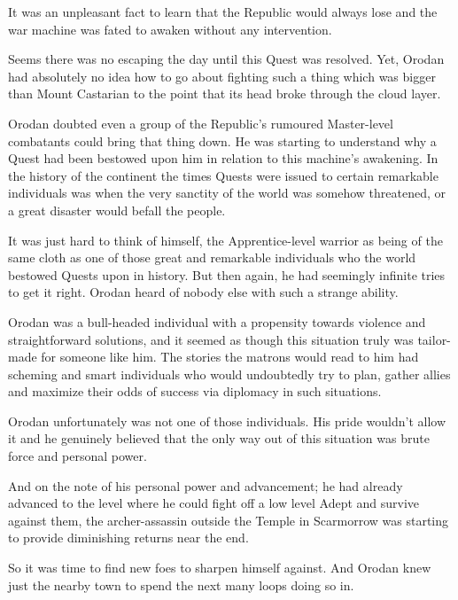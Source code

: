 \documentclass[a4paper,10pt]{book}
\begin{document}
It was an unpleasant fact to learn that the Republic would always lose and the war machine was fated to awaken without any intervention.\par
Seems there was no escaping the day until this Quest was resolved. Yet, Orodan had absolutely no idea how to go about fighting such a thing which was bigger than Mount Castarian to the point that its head broke through the cloud layer.\par
Orodan doubted even a group of the Republic’s rumoured Master-level combatants could bring that thing down. He was starting to understand why a Quest had been bestowed upon him in relation to this machine’s awakening. In the history of the continent the times Quests were issued to certain remarkable individuals was when the very sanctity of the world was somehow threatened, or a great disaster would befall the people.\par
It was just hard to think of himself, the Apprentice-level warrior as being of the same cloth as one of those great and remarkable individuals who the world bestowed Quests upon in history. But then again, he had seemingly infinite tries to get it right. Orodan heard of nobody else with such a strange ability.\par
Orodan was a bull-headed individual with a propensity towards violence and straightforward solutions, and it seemed as though this situation truly was tailor-made for someone like him. The stories the matrons would read to him had scheming and smart individuals who would undoubtedly try to plan, gather allies and maximize their odds of success via diplomacy in such situations.\par
Orodan unfortunately was not one of those individuals. His pride wouldn’t allow it and he genuinely believed that the only way out of this situation was brute force and personal power.\par
And on the note of his personal power and advancement; he had already advanced to the level where he could fight off a low level Adept and survive against them, the archer-assassin outside the Temple in Scarmorrow was starting to provide diminishing returns near the end.\par
So it was time to find new foes to sharpen himself against. And Orodan knew just the nearby town to spend the next many loops doing so in.\par
\end{document}

